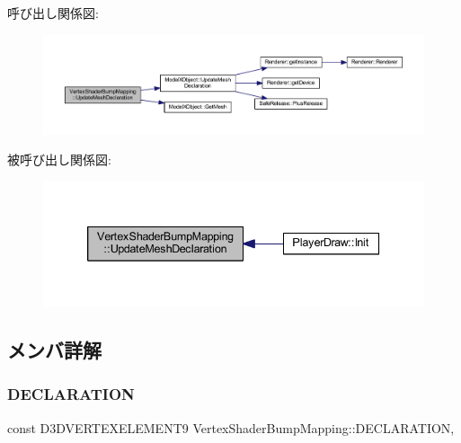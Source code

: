 呼び出し関係図\+:
\nopagebreak
\begin{figure}[H]
\begin{center}
\leavevmode
\includegraphics[width=350pt]{class_vertex_shader_bump_mapping_a659d50e57533b9cd0204fc169985f1e0_cgraph}
\end{center}
\end{figure}
被呼び出し関係図\+:\nopagebreak
\begin{figure}[H]
\begin{center}
\leavevmode
\includegraphics[width=339pt]{class_vertex_shader_bump_mapping_a659d50e57533b9cd0204fc169985f1e0_icgraph}
\end{center}
\end{figure}


\subsection{メンバ詳解}
\mbox{\label{class_vertex_shader_bump_mapping_ae4b0d38d68dc86b47ae17693cb214e06}} 
\subsubsection{\texorpdfstring{D\+E\+C\+L\+A\+R\+A\+T\+I\+ON}{DECLARATION}}
{\footnotesize\ttfamily const D3\+D\+V\+E\+R\+T\+E\+X\+E\+L\+E\+M\+E\+N\+T9 Vertex\+Shader\+Bump\+Mapping\+::\+D\+E\+C\+L\+A\+R\+A\+T\+I\+ON\hspace{0.3cm}{\ttfamily [static]}, {\ttfamily [private]}}

